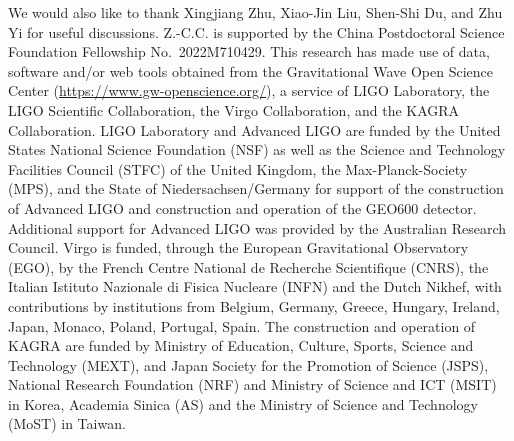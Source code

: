 \documentclass[twocolumn]{aastex631}
\begin{document}
\begin{acknowledgments}
We would also like to thank Xingjiang Zhu, Xiao-Jin Liu, Shen-Shi Du, and Zhu Yi for useful discussions.
Z.-C.C. is supported by the China Postdoctoral Science Foundation Fellowship No.~2022M710429.
This research has made use of data, software and/or web tools obtained from the Gravitational Wave Open Science Center (\url{https://www.gw-openscience.org/}), a service of LIGO Laboratory, the LIGO Scientific Collaboration, the Virgo Collaboration, and the KAGRA Collaboration. 
LIGO Laboratory and Advanced LIGO are funded by the United States National Science Foundation (NSF) as well as the Science and Technology Facilities Council (STFC) of the United Kingdom, the Max-Planck-Society (MPS), and the State of Niedersachsen/Germany for support of the construction of Advanced LIGO and construction and operation of the GEO600 detector. Additional support for Advanced LIGO was provided by the Australian Research Council. Virgo is funded, through the European Gravitational Observatory (EGO), by the French Centre National de Recherche Scientifique (CNRS), the Italian Istituto Nazionale di Fisica Nucleare (INFN) and the Dutch Nikhef, with contributions by institutions from Belgium, Germany, Greece, Hungary, Ireland, Japan, Monaco, Poland, Portugal, Spain. The construction and operation of KAGRA are funded by Ministry of Education, Culture, Sports, Science and Technology (MEXT), and Japan Society for the Promotion of Science (JSPS), National Research Foundation (NRF) and Ministry of Science and ICT (MSIT) in Korea, Academia Sinica (AS) and the Ministry of Science and Technology (MoST) in Taiwan.
\end{acknowledgments}	
	

\end{document}
